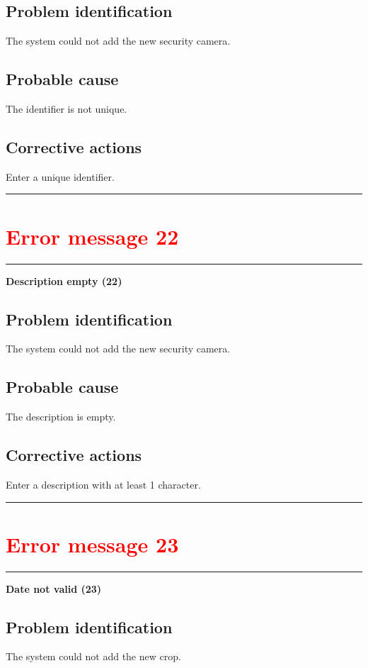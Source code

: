 \subsection{Problem identification}
The system could not add the new security camera.

\subsection{Probable cause}
The identifier is not unique.

\subsection{Corrective actions}
Enter a unique identifier.
\vspace{0.5cm}
\hrule
\hfill




\section{\textbf{\textcolor{red}{Error message 22}}}
\hrule
\vspace{0.5cm}
\textbf{Description empty (22)}
\subsection{Problem identification}
The system could not add the new security camera.

\subsection{Probable cause}
The description is empty.

\subsection{Corrective actions}
Enter a description with at least 1 character.
\vspace{0.5cm}
\hrule
\hfill




\section{\textbf{\textcolor{red}{Error message 23}}}
\hrule
\vspace{0.5cm}
\textbf{Date not valid (23)}
\subsection{Problem identification}
The system could not add the new crop.

